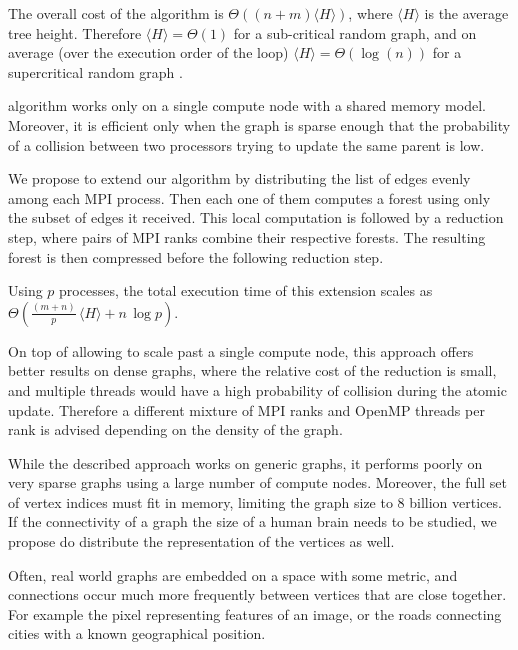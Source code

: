 The overall cost of the algorithm is $\Theta((n +
m)\langle H \rangle)$, where $\langle H \rangle$
is the average tree height. Therefore $\langle H \rangle = \Theta(1)$ for a sub-critical random graph,
and on average (over the execution order of the loop) $\langle H
\rangle = \Theta(\log(n))$
for a supercritical random graph \cite{RandomGraph}.

 algorithm \label{algorithm:cc2} works only on a single compute node with a shared memory model.
Moreover, it is efficient
only when the graph is sparse enough that the
probability of a collision between two processors
trying to update the same parent is low.

We propose to extend our algorithm by distributing the list of edges evenly among each MPI
process. %
Then each one of them computes a forest using only the subset of edges it
received. This local
computation
is followed by a reduction step, where pairs of MPI ranks combine their respective
forests.
The resulting forest is then compressed before the following reduction step.

Using $p$ processes, the total execution time of this extension scales as $\Theta(\frac{(m +
n)}{p}\, \langle H \rangle + n\,\log p)$.

On top of allowing to scale past a single compute node, this approach offers better results on
dense graphs, where the relative cost of the reduction is small, and multiple threads would have
a high probability of collision during the atomic update.
Therefore a different mixture of MPI ranks and OpenMP threads per rank is advised depending on the
density of the graph.

\label{section:distributed}
While the described approach works on generic graphs, it performs poorly on very sparse graphs using
a large number of compute nodes. Moreover, the full set of vertex indices must fit in memory, limiting
the graph size to $8$ billion vertices. If the connectivity of a graph the size of a human brain needs
to be studied,
we propose do distribute the representation of the vertices as well.

Often, real world graphs are embedded on a space with some metric, and connections
occur much more frequently between
vertices that are close together. For example the pixel representing features of an
image, or the roads connecting cities
with a known geographical position.

